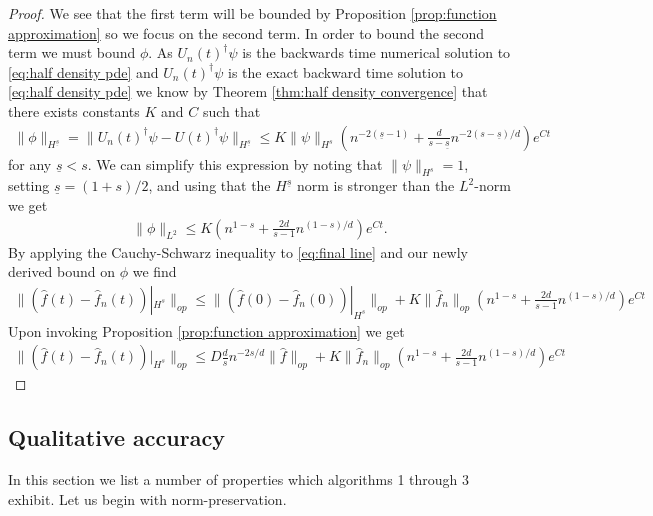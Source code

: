 \documentclass[12pt]{amsart}
\begin{document}
\begin{proof}
	We see that the first term will be bounded by Proposition \ref{prop:function approximation} so we focus on the second term.
	In order to bound the second term we must bound $\phi$.
	As $U_{n}(t)^{\dagger} \psi$ is the backwards time numerical solution to \eqref{eq:half density pde}
	and $U_{n}(t)^{\dagger}\psi$ is the exact backward time solution to \eqref{eq:half density pde} we know by Theorem \ref{thm:half density convergence} that
	there exists constants $K$ and $C$ such that
	\begin{align}
		\| \phi \|_{H^{\underline{s}}} = \| U_{n}(t)^{\dagger} \psi - U(t)^{\dagger} \psi \|_{H^{\underline{s}}}  \leq K \| \psi \|_{H^{s}} \left(  n^{-2(\underline{s}-1)} + \frac{d}{s - \underline{s}} n^{-2(s-\underline{s})/d} \right) e^{Ct} 
	\end{align}
	for any $\underline{s} <s$.
	We can simplify this expression by noting that $\| \psi \|_{H^{s}} = 1$, setting $\underline{s} = (1+s)/2$, and using that the $H^{\underline{s}}$ norm is stronger than the $L^{2}$-norm we get
	\begin{align}
		 \| \phi \|_{L^{2}}  \leq  K \left(  n^{1-s} + \frac{2d}{s -1} n^{(1-s)/d} \right) e^{Ct}.
	\end{align}
	By applying the Cauchy-Schwarz inequality to \eqref{eq:final line} and our newly derived bound on $\phi$ we find
	\begin{align}
		\| ( \hat{f}(t) - \hat{f}_{n}(t))|_{H^{s}} \|_{op} \leq \| ( \hat{f}(0) - \hat{f}_{n}(0) )|_{H^{s}} \|_{op} +  K \| \hat{f}_{n} \|_{op} \left( n^{1-s} + \frac{2d}{s -1} n^{(1-s)/d} \right) e^{Ct}
	\end{align}
	Upon invoking Proposition \ref{prop:function approximation} we get
	\begin{align}
		\| ( \hat{f}(t) - \hat{f}_{n}(t))|_{H^{s}} \|_{op} \leq D \frac{d}{s} n^{-2s/d} \| \hat{f} \|_{op}+  K \| \hat{f}_{n} \|_{op} \left( n^{1-s} + \frac{2d}{s -1} n^{(1-s)/d} \right) e^{Ct}
	\end{align}
\end{proof}


\subsection{Qualitative accuracy}
In this section we list a number of properties which algorithms 1 through 3 exhibit.  Let us begin with norm-preservation.
\end{document}
